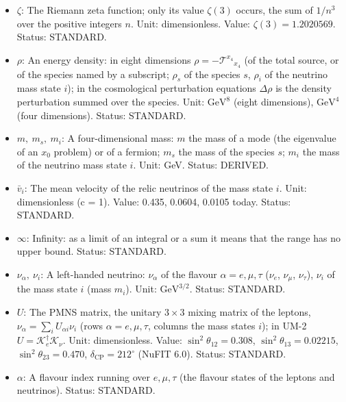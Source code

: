 \documentclass[
  10pt,
]{article}
\begin{document}
\begin{itemize}
  \(\pi\): The number pi, the ratio of the circumference of a circle to
  its diameter. Unit: dimensionless. Value: 3.141592654. Status:
  STANDARD.
\item
  \(\zeta\): The Riemann zeta function; only its value \(\zeta(3)\)
  occurs, the sum of \(1/n^3\) over the positive integers \(n\). Unit:
  dimensionless. Value: \(\zeta(3) = 1.2020569\). Status: STANDARD.
\item
  \(\rho\): An energy density: in eight dimensions
  \(\rho = -\mathcal{T}^{x_4}{}_{x_4}\) (of the total source, or of the
  species named by a subscript; \(\rho_s\) of the species \(s\),
  \(\rho_i\) of the neutrino mass state \(i\)); in the cosmological
  perturbation equations \(\Delta\rho\) is the density perturbation
  summed over the species. Unit: \(\mathrm{GeV}^{8}\) (eight
  dimensions), \(\mathrm{GeV}^{4}\) (four dimensions). Status: STANDARD.
\item
  \(m,\ m_s,\ m_i\): A four-dimensional mass: \(m\) the mass of a mode
  (the eigenvalue of an \(x_0\) problem) or of a fermion; \(m_s\) the
  mass of the species \(s\); \(m_i\) the mass of the neutrino mass state
  \(i\). Unit: GeV. Status: DERIVED.
\item
  \(\bar v_i\): The mean velocity of the relic neutrinos of the mass
  state \(i\). Unit: dimensionless (c = 1). Value: 0.435, 0.0604, 0.0105
  today. Status: STANDARD.
\item
  \(\infty\): Infinity: as a limit of an integral or a sum it means that
  the range has no upper bound. Status: STANDARD.
\item
  \(\nu_\alpha,\ \nu_i\): A left-handed neutrino: \(\nu_\alpha\) of the
  flavour \(\alpha = e, \mu, \tau\) (\(\nu_e\), \(\nu_\mu\),
  \(\nu_\tau\)), \(\nu_i\) of the mass state \(i\) (mass \(m_i\)). Unit:
  \(\mathrm{GeV}^{3/2}\). Status: STANDARD.
\item
  \(U\): The PMNS matrix, the unitary \(3 \times 3\) mixing matrix of
  the leptons, \(\nu_\alpha = \sum_iU_{\alpha i}\nu_i\) (rows
  \(\alpha = e, \mu, \tau\), columns the mass states \(i\)); in UM-2
  \(U = \mathcal{K}_e^\dagger\mathcal{K}_\nu\). Unit: dimensionless.
  Value: \(\sin^2\theta_{12} = 0.308\), \(\sin^2\theta_{13} = 0.02215\),
  \(\sin^2\theta_{23} = 0.470\), \(\delta_{\mathrm{CP}} = 212^\circ\)
  (NuFIT 6.0). Status: STANDARD.
\item
  \(\alpha\): A flavour index running over \(e, \mu, \tau\) (the flavour
  states of the leptons and neutrinos). Status: STANDARD.
\end{itemize}
\end{document}
